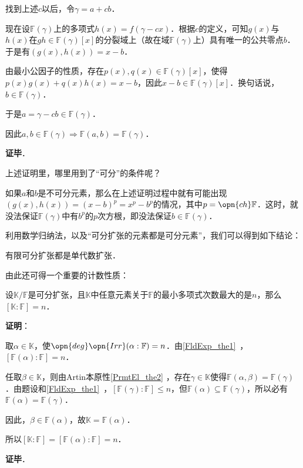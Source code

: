 找到上述$c$以后，令$\gamma=a+cb$．

现在设$\mathbb{F}(\gamma)$上的多项式$h(x)=f(\gamma-cx)$．根据$c$的定义，可知$g(x)$与$h(x)$在$gh\in\mathbb{F}(\gamma)[x]$的分裂域上（故在域$\mathbb{F}(\gamma)$上）具有唯一的公共零点$b$．于是有$(g(x), h(x))=x-b$．

由最小公因子的性质，存在$p(x), q(x)\in\mathbb{F}(\gamma)[x]$，使得$p(x)g(x)+q(x)h(x)=x-b$，因此$x-b\in\mathbb{F}(\gamma)[x]$．换句话说，$b\in\mathbb{F}(\gamma)$．

于是$a=\gamma-cb\in\mathbb{F}(\gamma)$．

因此$a, b\in\mathbb{F}(\gamma)\Rightarrow \mathbb{F}(a, b)=\mathbb{F}(\gamma)$．

\textbf{证毕}．

上述证明里，哪里用到了“可分”的条件呢？

如果$a$和$b$是不可分元素，那么在上述证明过程中就有可能出现$(g(x), h(x))=(x-b)^p=x^p-b^p$的情况，其中$p=\opn{ch}\mathbb{F}$．这时，就没法保证$\mathbb{F}(\gamma)$中有$b^p$的$p$次方根，即没法保证$b\in\mathbb{F}(\gamma)$．

利用数学归纳法，以及“可分扩张的元素都是可分元素”，我们可以得到如下结论：

\begin{corollary}{}\label{PrmtEl_cor2}
有限可分扩张都是单代数扩张．
\end{corollary}



由此还可得一个重要的计数性质：

\begin{corollary}{}\label{PrmtEl_cor3}
设$\mathbb{K}/\mathbb{F}$是可分扩张，且$\mathbb{K}$中任意元素关于$\mathbb{F}$的最小多项式次数最大的是$n$，那么$[\mathbb{K}:\mathbb{F}] = n$．
\end{corollary}

\textbf{证明}：

取$\alpha\in\mathbb{K}$，使$\opn{deg}\opn{Irr}(\alpha:\mathbb{F})=n$．由\autoref{FldExp_the1}~，$[\mathbb{F}(\alpha):\mathbb{F}]=n$．

任取$\beta\in\mathbb{K}$，则由Artin本原性\autoref{PrmtEl_the2} ，存在$\gamma\in\mathbb{K}$使得$\mathbb{F}(\alpha, \beta)=\mathbb{F}(\gamma)$．由题设和\autoref{FldExp_the1}~，$[\mathbb{F}(\gamma):\mathbb{F}]\leq n$，但$\mathbb{F}(\alpha)\subseteq\mathbb{F}(\gamma)$，所以必有$\mathbb{F}(\alpha)=\mathbb{F}(\gamma)$．

因此，$\beta\in\mathbb{F}(\alpha)$，故$\mathbb{K}=\mathbb{F}(\alpha)$．

所以$[\mathbb{K}:\mathbb{F}]=[\mathbb{F}(\alpha):\mathbb{F}]=n$．

\textbf{证毕}．
















